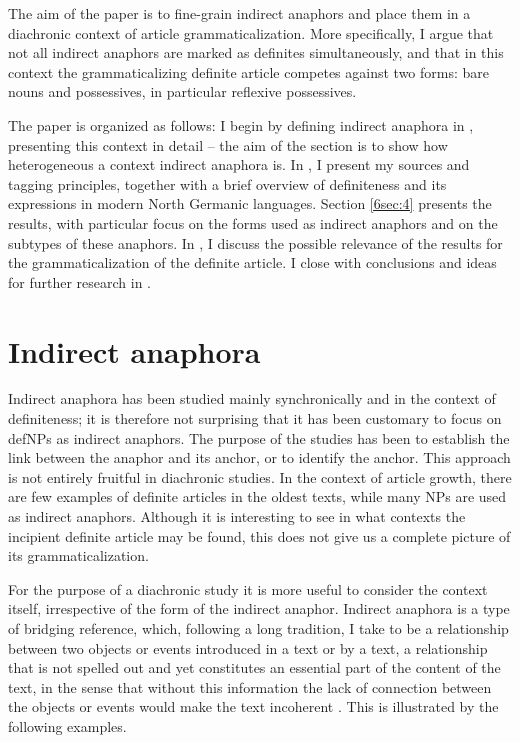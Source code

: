 \documentclass[output=paper]{langsci/langscibook}
\begin{document}
The aim of the paper is to fine-grain indirect anaphors and place them in a diachronic context of article grammaticalization. More specifically, I argue that not all indirect anaphors are marked as definites simultaneously, and that in this context the grammaticalizing definite article competes against two forms: bare nouns and possessives, in particular reflexive possessives. 

The paper is organized as follows: I begin by defining indirect anaphora in , presenting this context in detail -- the aim of the section is to show how heterogeneous a context indirect anaphora is. In , I present my sources and tagging principles, together with a brief overview of definiteness and its expressions in modern North Germanic languages. Section \ref{6sec:4} presents the results, with particular focus on the forms used as indirect anaphors and on the subtypes of these anaphors. In , I discuss the possible relevance of the results for the grammaticalization of the definite article. I close with conclusions and ideas for further research in .


\section{Indirect anaphora}\label{6sec:2}

Indirect anaphora has been studied mainly synchronically and in the context of definiteness; it is therefore not surprising that it has been customary to focus on defNPs as indirect anaphors. The purpose of the studies has been to establish the link between the anaphor and its anchor, or to identify the anchor. This approach is not entirely fruitful in diachronic studies. In the context of article growth, there are few examples of definite articles in the oldest texts, while many NPs are used as indirect anaphors. Although it is interesting to see in what contexts the incipient definite article may be found, this does not give us a complete picture of its grammaticalization. 

For the purpose of a diachronic study it is more useful to consider the context itself, irrespective of the form of the indirect anaphor. Indirect anaphora is a type of bridging reference, which, following a long tradition, I take to be a relationship between two objects or events introduced in a text or by a text, a relationship that is not spelled out and yet constitutes an essential part of the content of the text, in the sense that without this information the lack of connection between the objects or events would make the text incoherent \citep{asher:lascarides:98}. This is illustrated by the following examples. 
\end{document}
